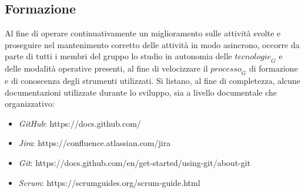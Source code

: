 \subsection{Formazione}
Al fine di operare continuativamente un miglioramento sulle attività svolte e proseguire nel mantenimento corretto delle attività in modo asincrono, occorre da parte di tutti i membri del gruppo lo studio in autonomia delle $\textit{tecnologie}_G$ e delle modalità operative presenti, al fine di velocizzare il $\textit{processo}_G$ di formazione e di conoscenza degli strumenti utilizzati. Si listano, al fine di
completezza, alcune documentazioni utilizzate durante lo sviluppo, sia a livello documentale che organizzativo:

\begin{itemize}
    \item \textit{GitHub}: https://docs.github.com/
    \item \textit{Jira}: https://confluence.atlassian.com/jira
    \item \textit{Git}: https://docs.github.com/en/get-started/using-git/about-git
    \item \textit{Scrum}: https://scrumguides.org/scrum-guide.html
\end{itemize}